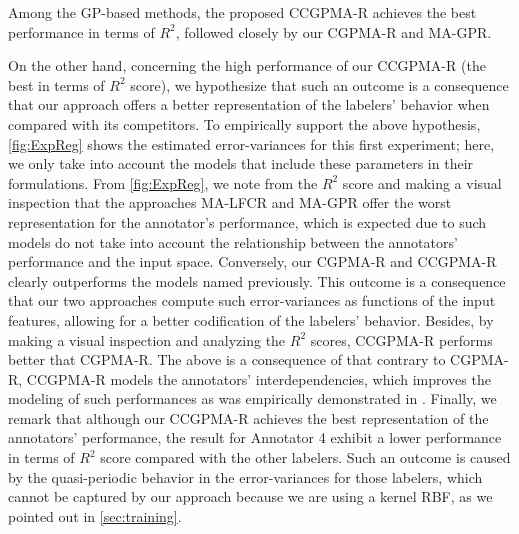 \documentclass[journal]{IEEEtran}
\begin{document}
Among the GP-based methods, the proposed CCGPMA-R achieves the best performance in terms of $R^2$, followed closely by our CGPMA-R and MA-GPR. 

On the other hand, concerning the high performance of our CCGPMA-R (the best in terms of $R^2$ score), we hypothesize that such an outcome is a consequence that our approach offers a better representation of the labelers' behavior when compared with its competitors. To empirically support the above hypothesis, \cref{fig:ExpReg} shows the estimated error-variances for this first experiment; here, we only take into account the models that include these parameters in their formulations. From \cref{fig:ExpReg}, we note from the $R^2$ score and making a visual inspection that the approaches MA-LFCR and MA-GPR offer the worst representation for the annotator's performance, which is expected due to such models do not take into account the relationship between the annotators' performance and the input space. Conversely, our CGPMA-R and CCGPMA-R clearly outperforms the models named previously. This outcome is a consequence that our two approaches compute such error-variances as functions of the input features, allowing for a better codification of the labelers' behavior. Besides, by making a visual inspection and analyzing the $R^2$ scores, CCGPMA-R performs better that CGPMA-R. The above is a consequence of that contrary to CGPMA-R, CCGPMA-R models the annotators' interdependencies, which improves the modeling of such performances as was empirically demonstrated in \cite{zhu2019unsupervised}. Finally, we remark that although our CCGPMA-R achieves the best representation of the annotators' performance, the result for Annotator 4 exhibit a lower performance in terms of $R^2$ score compared with the other labelers. Such an outcome is caused by the quasi-periodic behavior in the error-variances for those labelers, which cannot be captured by our approach because we are using a kernel RBF, as we pointed out in \cref{sec:training}.
\end{document}
